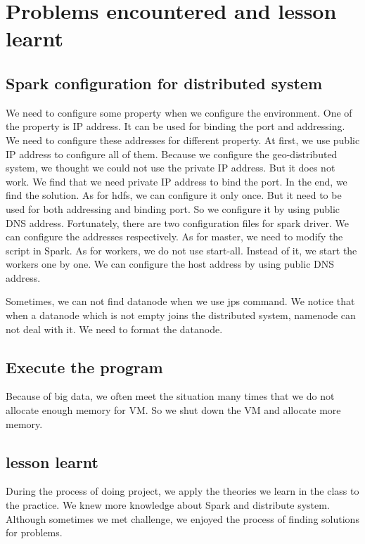 \documentclass[base.tex]{subfiles}
\begin{document}
\section{Problems encountered and lesson learnt}
\subsection{Spark configuration for distributed system}
We need to configure some property when we configure the environment. One of the property is IP address. It can be used for binding the port and addressing. We need to configure these addresses for different property. At first, we use public IP address to configure all of them. Because we configure the geo-distributed system, we thought we could not use the private IP address. But it does not work. We find that we need private IP address to bind the port. In the end, we find the solution. As for hdfs, we can configure it only once. But it need to be used for both addressing and binding port. So we configure it by using public DNS address. Fortunately, there are two configuration files for spark driver. We can configure the addresses respectively. As for master, we need to modify the script in Spark. As for workers, we do not use start-all. Instead of it, we start the workers one by one. We can configure the host address by using public DNS address.  

Sometimes, we can not find datanode when we use jps command. We notice that when a datanode which is not empty joins the distributed system, namenode can not deal with it. We need to format the datanode.

\subsection{Execute the program}
Because of big data, we often meet the situation many times that we do not allocate enough memory for VM. So we shut down the VM and allocate more memory.

\subsection{lesson learnt}
During the process of doing project, we apply the theories we learn in the class to the practice. We knew more knowledge about Spark and distribute system. Although sometimes we met challenge, we enjoyed the process of finding solutions for problems.
\end{document}
